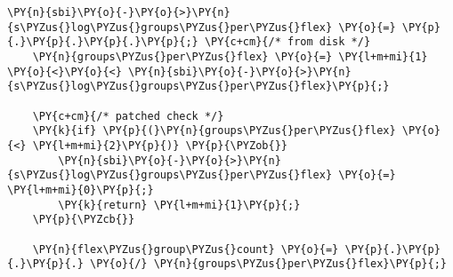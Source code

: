 \begin{Verbatim}[commandchars=\\\{\},codes={\catcode`\$=3\catcode`\^=7\catcode`\_=8}]
    \PY{n}{sbi}\PY{o}{-}\PY{o}{>}\PY{n}{s\PYZus{}log\PYZus{}groups\PYZus{}per\PYZus{}flex} \PY{o}{=} \PY{p}{.}\PY{p}{.}\PY{p}{.}\PY{p}{;} \PY{c+cm}{/* from disk */}
    \PY{n}{groups\PYZus{}per\PYZus{}flex} \PY{o}{=} \PY{l+m+mi}{1} \PY{o}{<}\PY{o}{<} \PY{n}{sbi}\PY{o}{-}\PY{o}{>}\PY{n}{s\PYZus{}log\PYZus{}groups\PYZus{}per\PYZus{}flex}\PY{p}{;}

    \PY{c+cm}{/* patched check */}
    \PY{k}{if} \PY{p}{(}\PY{n}{groups\PYZus{}per\PYZus{}flex} \PY{o}{<} \PY{l+m+mi}{2}\PY{p}{)} \PY{p}{\PYZob{}}
        \PY{n}{sbi}\PY{o}{-}\PY{o}{>}\PY{n}{s\PYZus{}log\PYZus{}groups\PYZus{}per\PYZus{}flex} \PY{o}{=} \PY{l+m+mi}{0}\PY{p}{;}
        \PY{k}{return} \PY{l+m+mi}{1}\PY{p}{;}
    \PY{p}{\PYZcb{}}

    \PY{n}{flex\PYZus{}group\PYZus{}count} \PY{o}{=} \PY{p}{.}\PY{p}{.}\PY{p}{.} \PY{o}{/} \PY{n}{groups\PYZus{}per\PYZus{}flex}\PY{p}{;}
\end{Verbatim}
